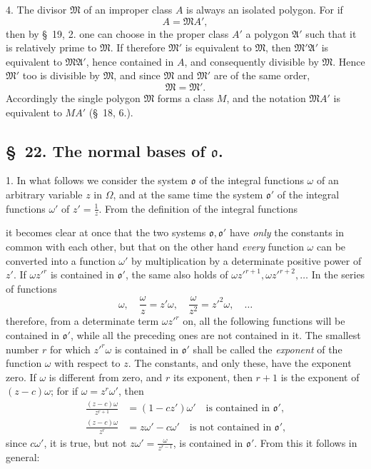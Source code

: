 \documentclass{article}
\begin{document}
4. The divisor $\mathfrak{M}$ of an improper class $A$ is always an isolated polygon. For if
\[ A = \mathfrak{M}A', \]
then by §~19, 2. one can choose in the proper class $A'$ a polygon $\mathfrak{A}'$ such that it is relatively prime to $\mathfrak{M}$. If therefore $\mathfrak{M}'$ is equivalent to $\mathfrak{M}$, then $\mathfrak{M}'\mathfrak{A}'$ is equivalent to $\mathfrak{M}\mathfrak{A}'$, hence contained in $A$, and consequently divisible by $\mathfrak{M}$. Hence $\mathfrak{M}'$ too is divisible by $\mathfrak{M}$, and since $\mathfrak{M}$ and $\mathfrak{M}'$ are of the same order,
\[ \mathfrak{M} = \mathfrak{M}'. \]
Accordingly the single polygon $\mathfrak{M}$ forms a class $M$, and the notation $\mathfrak{M}A'$ is equivalent to $MA'$ (§~18, 6.).

\subsection*{§~22. The normal bases of $\mathfrak{o}$.}

1. In what follows we consider the system $\mathfrak{o}$ of the integral functions $\omega$ of an arbitrary variable $z$ in $\Omega$, and at the same time the system $\mathfrak{o}'$ of the integral functions $\omega'$ of $z' = \frac{1}{z}$. From the definition of the integral functions

it becomes clear at once that the two systems $\mathfrak{o}, \mathfrak{o}'$ have \emph{only} the constants in common with each other, but that on the other hand \emph{every} function $\omega$ can be converted into a function $\omega'$ by multiplication by a determinate positive power of $z'$. If $\omega z'^{r}$ is contained in $\mathfrak{o}'$, the same also holds of $\omega z'^{r+1}, \omega z'^{r+2}, \ldots$ In the series of functions
\[ \omega, \quad \frac{\omega}{z} = z'\omega, \quad \frac{\omega}{z^{2}} = z'^{2}\omega, \quad \ldots \]
therefore, from a determinate term $\omega z'^{r}$ on, all the following functions will be contained in $\mathfrak{o}'$, while all the preceding ones are not contained in it. The smallest number $r$ for which $z'^{r}\omega$ is contained in $\mathfrak{o}'$ shall be called the \emph{exponent} of the function $\omega$ with respect to $z$. The constants, and only these, have the exponent zero. If $\omega$ is different from zero, and $r$ its exponent, then $r+1$ is the exponent of $(z-c)\omega$; for if $\omega = z^{r}\omega'$, then
\[ \begin{aligned} \frac{(z-c)\omega}{z^{r+1}} &= (1-cz')\omega' \quad \text{is contained in } \mathfrak{o}' \text{,} \\ \frac{(z-c)\omega}{z^{r}} &= z\omega' - c\omega' \quad \text{is not contained in } \mathfrak{o}' \text{,} \end{aligned} \]
since $c\omega'$, it is true, but not $z\omega' = \frac{\omega}{z^{r-1}}$, is contained in $\mathfrak{o}'$. From this it follows in general:
\end{document}
